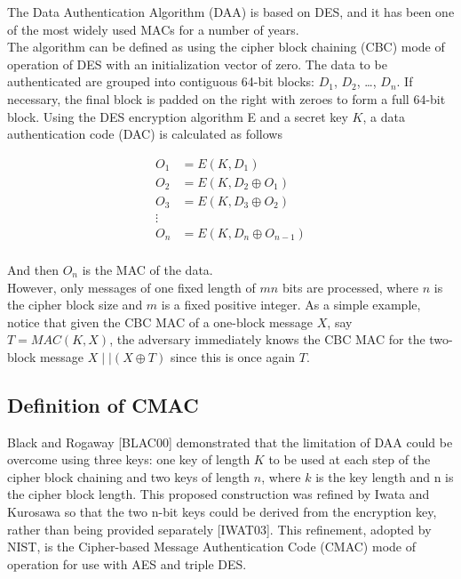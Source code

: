 \documentclass[12pt,a4paper,oneside]{report}
\begin{document}
The Data Authentication Algorithm (DAA) is based on DES, and it has been one of the most widely used MACs for a number of years. \\

The algorithm can be defined as using the cipher block chaining (CBC) mode of operation of DES with an initialization vector of zero. The data  to be authenticated are grouped into contiguous 64-bit
blocks: $D_1$, $D_2$, \dots, $D_n$. If necessary, the final block is padded on the right with zeroes
to form a full 64-bit block. Using the DES encryption algorithm E and a secret key $K$,
a data authentication code (DAC) is calculated as follows

\begin{align*}
    O_1 &= E(K,D_1) \\
    O_2 &= E(K,D_2 \oplus O_1) \\
    O_3 &= E(K,D_3 \oplus O_2) \\
    \vdots \\
    O_n &= E(K,D_n \oplus O_{n-1}) \\
\end{align*}

And then $O_n$ is the MAC of the data.\\

However, only messages of one fixed length of $mn$ bits
are processed, where $n$ is the cipher block size and $m$ is a fixed positive integer. As a
simple example, notice that given the CBC MAC of a one-block message $X$, say
$T = MAC(K, X)$, the adversary immediately knows the CBC MAC for the two-
block message $X \mid\mid (X \oplus T)$ since this is once again $T$.

\subsection{Definition of CMAC}

Black and Rogaway [BLAC00] demonstrated that the limitation of DAA could be
overcome using three keys: one key of length $K$ to be used at each step of the
cipher block chaining and two keys of length $n$, where $k$ is the key length and n is
the cipher block length. This proposed construction was refined by Iwata and
Kurosawa so that the two n-bit keys could be derived from the encryption key,
rather than being provided separately [IWAT03]. This refinement, adopted by
NIST, is the Cipher-based Message Authentication Code (CMAC) mode of operation
for use with AES and triple DES. \\
\end{document}
